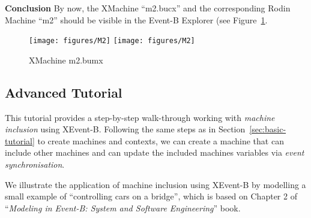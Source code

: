 \textbf{Conclusion} By now, the XMachine ``m2.bucx'' and the corresponding Rodin Machine ``m2'' should be visible in the Event-B Explorer (see Figure~\ref{fig:M2}.
  \begin{figure}[!htbp]
    \centering
    \texttt{[image: figures/M2]}
    \else
    \texttt{[image: figures/M2]}
    \endif
    \caption{XMachine m2.bumx}
    \label{fig:M2}
  \end{figure}

\subsection{Advanced Tutorial}
\label{sec:advanced-tutorial}

This tutorial provides a step-by-step walk-through working with \emph{machine inclusion} using XEvent-B. Following the same steps as in Section~\ref{sec:basic-tutorial} to create machines and contexts, we can create a machine that can include other machines and can update the included machines variables via \emph{event synchronisation}.

We illustrate the application of machine inclusion using XEvent-B by modelling a small example of ``controlling cars on a bridge'', which is based on Chapter 2 of ``\emph{Modeling in Event-B: System and Software Engineering}'' book.

